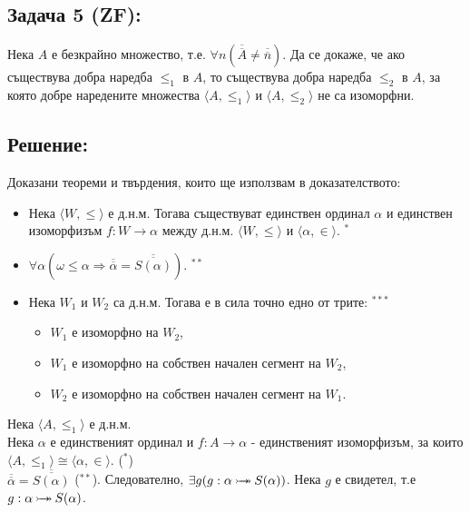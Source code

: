 \documentclass[french]{article}
\begin{document}
	
	\subsection*{Задача 5 (ZF):}
	Нека $A$ е безкрайно множество, т.е. $\forall n (\overline{\overline{A}} \not= \overline{\overline{n}})$. Да се докаже, че ако съществува добра наредба $\le_1$ в $A$, то съществува добра наредба $\le_2$ в $A$, за която добре наредените множества $\langle A, \le_1 \rangle$ и $\langle A, \le_2 \rangle$ не са изоморфни.
	
	\subsection*{Решение:}
   	Доказани теореми и твърдения, които ще използвам в доказателството: \\
   	\begin{itemize}
   		\item Нека $\langle W, \le \rangle$ е д.н.м. Тогава съществуват единствен ординал $\alpha$ и единствен изоморфизъм $f : W \to \alpha$ между д.н.м. $\langle W, \le \rangle$ и $\langle \alpha, \in \rangle$. $^*$
   		\item $\forall \alpha(\omega \le \alpha \Rightarrow \overline{\overline{\alpha}} = \overline{\overline{S(\alpha)}})$. $^{**}$
   		\item Нека $W_1$ и $W_2$ са д.н.м. Тогава е в сила точно едно
   		от трите: $^{***}$
   		\begin{itemize}
   	    	\item $W_1$ е изоморфно на $W_2$,
   	    	\item $W_1$ е изоморфно на собствен начален сегмент на $W_2$,
   	    	\item $W_2$ е изоморфно на собствен начален сегмент на $W_1$.
    	\end{itemize}
   	\end{itemize}
    Нека $\langle A, \le_1 \rangle$ е д.н.м. \\
    Нека $\alpha$ е единственият ординал и $f : A \to \alpha$ - единственият изоморфизъм, за които $\langle A, \le_1 \rangle \cong \langle \alpha, \in \rangle$. ($^*$) \\
    $\overline{\overline{\alpha}} = \overline{\overline{S(\alpha)}}$ ($^{**}$). Следователно, $\exists g(g : \alpha \mathbin{\rightarrowtail \hspace{-8pt} \twoheadrightarrow} S(\alpha))$. Нека $g$ е свидетел, т.е $g : \alpha \mathbin{\rightarrowtail \hspace{-8pt} \twoheadrightarrow} S(\alpha)$. \\
\end{document}
